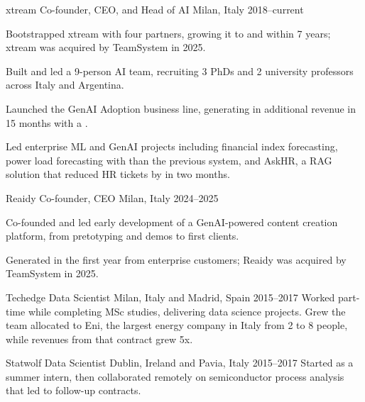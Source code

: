 \documentclass[10pt,a4paper]{article}
\begin{document}
\makecvheader[C]

\begin{cventries}
  \cventry
    {xtream}
    {Co-founder, CEO, and Head of AI}
    {Milan, Italy}
    {2018--current}
    {\begin{cvitems}
      \item Bootstrapped xtream with four partners, growing it to  and  within 7 years; xtream was acquired by TeamSystem in 2025.
      \item Built and led a 9-person AI team, recruiting 3 PhDs and 2 university professors across Italy and Argentina.
      \item Launched the GenAI Adoption business line, generating  in additional revenue in 15 months with a .
      \item Led enterprise ML and GenAI projects including financial index forecasting, power load forecasting with  than the previous system, and AskHR, a RAG solution that reduced HR tickets by  in two months.
    \end{cvitems}}

  \cventry
    {Reaidy}
    {Co-founder, CEO}
    {Milan, Italy}
    {2024--2025}
    {\begin{cvitems}
      \item Co-founded and led early development of a GenAI-powered content creation platform, from pretotyping and demos to first clients.
      \item Generated  in the first year from enterprise customers; Reaidy was acquired by TeamSystem in 2025.
    \end{cvitems}}

  \cventry
    {Techedge}
    {Data Scientist}
    {Milan, Italy and Madrid, Spain}
    {2015--2017}
    {Worked part-time while completing MSc studies, delivering data science projects. Grew the team allocated to Eni, the largest energy company in Italy from 2 to 8 people, while revenues from that contract grew 5x.}

  \cventry
    {Statwolf}
    {Data Scientist}
    {Dublin, Ireland and Pavia, Italy}
    {2015--2017}
    {Started as a summer intern, then collaborated remotely on semiconductor process analysis that led to follow-up contracts.}
\end{cventries}
\end{document}

